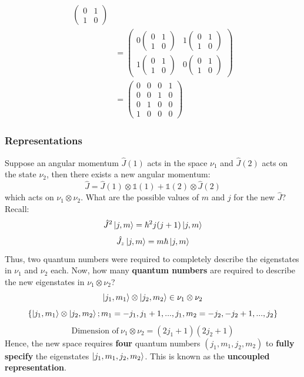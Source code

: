 \documentclass{article}
\begin{document}
\begin{flushleft}
\begin{align*}
\begin{pmatrix}
        0&1\\
        1&0
    \end{pmatrix}\\
    &=\begin{pmatrix}
        0\begin{pmatrix}
        0&1\\
        1&0
    \end{pmatrix}&1\begin{pmatrix}
        0&1\\
        1&0
    \end{pmatrix}\\
    1\begin{pmatrix}
        0&1\\
        1&0
    \end{pmatrix}&0\begin{pmatrix}
        0&1\\
        1&0
    \end{pmatrix}
    \end{pmatrix}\\
    &=\begin{pmatrix}
        0&0&0&1\\
        0&0&1&0\\
        0&1&0&0\\
        1&0&0&0
    \end{pmatrix}
\end{align*}

\subsubsection{Representations}

Suppose an angular momentum $\hat{J}(1)$ acts in the space $\nu_1$ and $\hat{J}(2)$ acts on the state $\nu_2$, then there exists a new angular momentum:
$$\hat{J}=\hat{J}(1)\otimes\mathbb{1}(1)+\mathbb{1}(2)\otimes\hat{J}(2)$$
which acts on $\nu_1\otimes\nu_2$. What are the possible values of $m$ and $j$ for the new $\hat{J}$? Recall:
$$\hat{J}^2\ket{j,m}=\hbar^2j(j+1)\ket{j,m}$$
$$\hat{J_z}\ket{j,m}=m\hbar\ket{j,m}$$
Thus, two quantum numbers were required to completely describe the eigenstates in $\nu_1$ and $\nu_2$ each. Now, how many \textbf{quantum numbers} are required to describe the new eigenstates in $\nu_1\otimes\nu_2$?
$$\ket{j_1,m_1}\otimes\ket{j_2,m_2}\in\nu_1\otimes\nu_2$$
$$\{\ket{j_1,m_1}\otimes\ket{j_2,m_2};m_1=-j_1,j_1+1,...,j_1,m_2=-j_2,-j_2+1,...,j_2\}$$
$$\text{Dimension of}\ \nu_1\otimes\nu_2=(2j_1+1)(2j_2+1)$$
Hence, the new space requires \textbf{four} quantum numbers $(j_1,m_1,j_2,m_2)$ to \textbf{fully specify} the eigenstates $\ket{j_1,m_1,j_2,m_2}$. This is known as the \textbf{uncoupled representation}.\\[0.5cm]


\end{flushleft}
\end{document}

